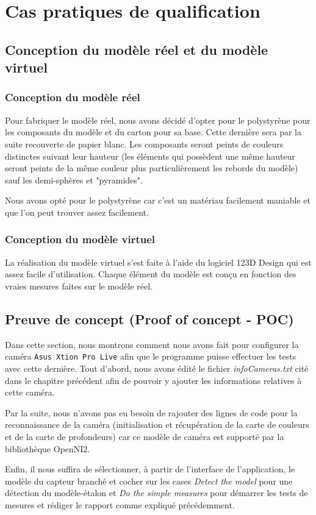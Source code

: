 \documentclass[a4paper, 12pt]{book}
\newcounter{program}[subsection]
\begin{document}
\chapter{Cas pratiques de qualification}

\section{Conception du modèle réel et du modèle virtuel}
\subsection{Conception du modèle réel}
Pour fabriquer le modèle réel, nous avons décidé d'opter pour le polystyrène pour les composants du modèle et du carton pour sa base. Cette dernière sera par la suite recouverte de papier blanc. Les composants seront peints de couleurs distinctes suivant leur hauteur (les éléments qui possèdent une même hauteur seront peints de la même couleur plus particulièrement les rebords du modèle) sauf les demi-sphères et "pyramides".
\par Nous avons opté pour le polystyrène car c'est un matériau facilement maniable et que l'on peut trouver assez facilement.
\subsection{Conception du modèle virtuel}
La réalisation du modèle virtuel s'est faite à l'aide du logiciel 123D Design qui est assez facile d'utilisation. Chaque élément du modèle est conçu en fonction des vraies mesures faites sur le modèle réel.


\section{Preuve de concept (Proof of concept - POC)}
Dans cette section, nous montrons comment nous avons fait pour configurer la caméra \texttt{Asus Xtion Pro Live} afin que le programme puisse effectuer les tests avec cette dernière.
Tout d'abord, nous avons édité le fichier \emph{infoCameras.txt} cité dans le chapitre précédent afin de pouvoir y ajouter les informations relatives à cette caméra.
\par Par la suite, nous n'avons pas eu besoin de rajouter des lignes de code pour la reconnaissance de la caméra (initialisation et récupération de la carte de couleurs et de la carte de profondeurs) car ce modèle de caméra est supporté par la bibliothèque OpenNI2.
\par Enfin, il nous suffira de sélectionner, à partir de l'interface de l'application, le modèle du capteur branché et cocher sur les cases \emph{Detect the model} pour une détection du modèle-étalon et \emph{Do the simple measures} pour démarrer les tests de mesures et rédiger le rapport comme expliqué précédemment. 
\end{document}
